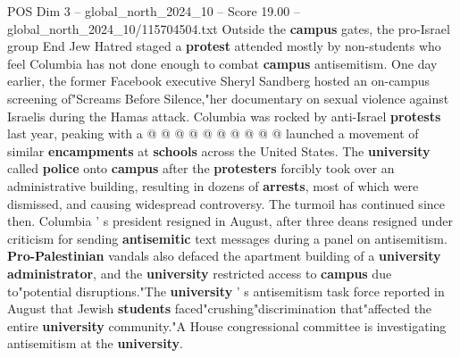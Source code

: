 \begin{textsample}{POS Dim 3 – global\_north\_2024\_10 – Score 19.00 – global\_north\_2024\_10/115704504.txt}
Outside the \textbf{campus} gates, the pro-Israel group End Jew Hatred staged a \textbf{protest} attended mostly by non-students who feel Columbia has not done enough to combat \textbf{campus} antisemitism.
One day earlier, the former Facebook executive Sheryl Sandberg hosted an on-campus screening of"Screams Before Silence,"her documentary on sexual violence against Israelis during the Hamas attack.
Columbia was rocked by anti-Israel \textbf{protests} last year, peaking with a @ @ @ @ @ @ @ @ @ @ launched a movement of similar \textbf{encampments} at \textbf{schools} across the United States.
The \textbf{university} called \textbf{police} onto \textbf{campus} after the \textbf{protesters} forcibly took over an administrative building, resulting in dozens of \textbf{arrests}, most of which were dismissed, and causing widespread controversy.
The turmoil has continued since then.
Columbia ' s president resigned in August, after three deans resigned under criticism for sending \textbf{antisemitic} text messages during a panel on antisemitism. \textbf{Pro-Palestinian} vandals also defaced the apartment building of a \textbf{university} \textbf{administrator}, and the \textbf{university} restricted access to \textbf{campus} due to"potential disruptions."The \textbf{university} ' s antisemitism task force reported in August that Jewish \textbf{students} faced"crushing"discrimination that"affected the entire \textbf{university} community."A House congressional committee is investigating antisemitism at the \textbf{university}.

\end{textsample}

